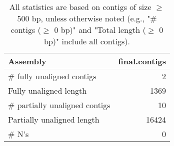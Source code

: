 \documentclass[12pt,a4paper]{article}
\begin{document}
\begin{table}[ht]
\begin{center}
\caption{All statistics are based on contigs of size $\geq$ 500 bp, unless otherwise noted (e.g., "\# contigs ($\geq$ 0 bp)" and "Total length ($\geq$ 0 bp)" include all contigs).}
\begin{tabular}{|l*{1}{|r}|}
\hline
Assembly & final.contigs \\ \hline
\# fully unaligned contigs & 2 \\ \hline
Fully unaligned length & 1369 \\ \hline
\# partially unaligned contigs & 10 \\ \hline
Partially unaligned length & 16424 \\ \hline
\# N's & 0 \\ \hline
\end{tabular}
\end{center}
\end{table}
\end{document}
